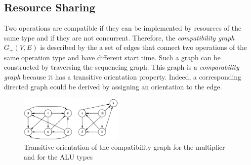 \subsection{Resource Sharing}
Two operations are compatible  if  they can be implemented by resources of the same type and if they are not concurrent. Therefore, the \textit{compatibility graph} $ G_{+}(V,E) $ is described by the a set of edges that connect two operations of the same operation type and have different start time. Such a graph can be constructed by traversing the sequencing graph. This graph is a \textit{comparability graph} because it has a transitive orientation property. Indeed, a corresponding directed graph could be derived by assigning an orientation to the edge.
\begin{figure}[H]
    \centering
    \includegraphics[width=0.45\textwidth]{./Cap5/Images/Image06.png}
    \caption{Transitive  orientation  of  the compatibility  graph for the multiplier and for the ALU types}
    \label{fig:Transi}
\end{figure}

